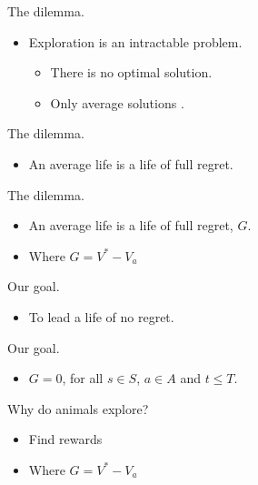\documentclass[10pt]{beamer}
\begin{document}
\begin{frame}[fragile]{The dilemma.}
\begin{itemize}
    \item Exploration is an intractable problem.
    \begin{itemize}
    \item There is no optimal solution.
    \item Only average solutions \cite{Thrun1992a,Dayan1996,Findling2018,Gershman2018b}.
    \end{itemize}
\end{itemize}
\end{frame}

\begin{frame}[fragile]{The dilemma.}
\begin{itemize}
    \item An average life is a life of full regret.
\end{itemize}
\end{frame}

\begin{frame}[fragile]{The dilemma.}
\begin{itemize}
    \item An average life is a life of full regret, $G$.
    \item Where $G = V^* - V_a$
\end{itemize}
\end{frame}

\begin{frame}[fragile]{Our goal.}
\begin{itemize}
    \item To lead a life of no regret.
\end{itemize}
\end{frame}

\begin{frame}[fragile]{Our goal.}
\begin{itemize}
    \item $G=0$, for all $s \in S$, $a \in A$ and $t \leq T$.
\end{itemize}
\end{frame}

\begin{frame}[fragile]{Why do animals explore?}
\begin{itemize}
    \item Find rewards
    \item Where $G = V^* - V_a$
\end{itemize}
\end{frame}
\end{document}
